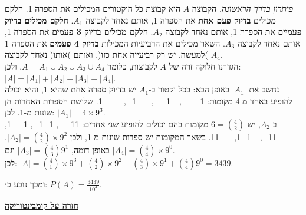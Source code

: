 \documentclass[12pt,a4paper]{article}
\begin{document}
\begin{enumerate}[label=\textcolor{BurntOrange}{שאלה \arabic*: }]
\begin{Solution}
\textit{פיתרון בדרך הראשונה.} הקבוצה $A$ היא קבוצת כל הוקטורים המכילים את הספרה 1. חלקם מכילים \textbf{בדיוק פעם אחת} את הספרה 1, אותם נאחד לקבוצה $A_1$. \textbf{חלקם מכילים בדיוק פעמיים} את הספרה 1, אותם נאחד לקבוצה $A_2$. \textbf{חלקם מכילים בדיוק 3 פעמים} את הספרה 1, אותם נאחד לקבוצה $A_3$. השאר מכילים את הרביעיות המכילות \textbf{בדיוק 4 פעמים} את הספרה 1 )למעשה, יש רק רביעייה אחת כזו(, ואותם )אותו( נאחד לקבוצה $A_4$. \\
הגדרנו חלוקה זרה של $A$ לקבוצות, כלומר $A = A_1 \cup A_2 \cup A_3 \cup A_4$, ולכן: $\lvert A \rvert = \lvert A_1 \rvert + \lvert A_2 \rvert + \lvert A_3 \rvert + \lvert A_4 \rvert$. \\
נחשב את $\lvert A_1 \rvert$ באופן הבא: בכל וקטור ב-$A_1$ יש בדיוק ספרה אחת שהיא 1, והיא יכולה להופיע באחד מ-4 מקומות: 1\_\_\_, \_1\_\_, \_\_1\_, \_\_\_1. שלושת הספרות האחרות הן שונות מ-1. לכן: $\lvert A_1 \rvert = 4 \times 9^3$.\\
ב-$A_2$, יש $6=\binom{4}{2}$ מקומות בהם יכולים להופיע שני אחדים: 11\_\_, 1\_1\_, 1\_\_1, \_11\_, \_1\_1, \_\_11. בשאר המקומות יש ספרות שונות מ-1, ולכן $\lvert A_2 \rvert = \binom{4}{2} \times 9^2$. באופן דומה, $\lvert A_3 \rvert = \binom{4}{3} 9^1$ וגם $\lvert A_4 \rvert = \binom{4}{4} \times 9^0$.\\
לכן: $\lvert A \rvert = \binom{4}{1} \times 9^3 + \binom{4}{2} \times 9^2 + \binom{4}{3} \times 9^1 + \binom{4}{4} 9^0 = 3439$.

ומכך נובע כי: $P(A) = \frac{3439}{10^4}$.
\end{Solution}
\end{enumerate}

\bigskip
\begingroup 
\color{MidnightBlue}
\Large \textbf{\underline{חזרה על קומבינטוריקה}} \\
\endgroup
\end{document}
